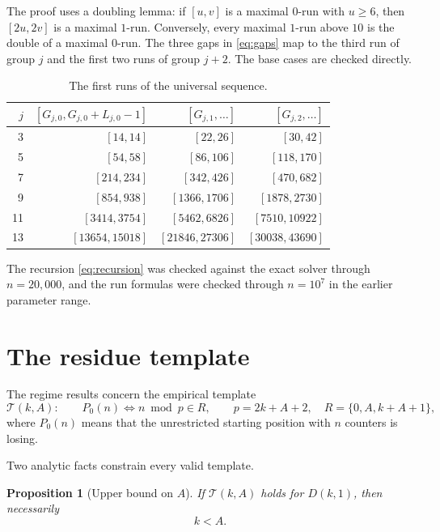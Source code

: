 \documentclass[11pt]{article}
\newtheorem{proposition}[theorem]{Proposition}
\theoremstyle{remark}
\begin{document}
The proof uses a doubling lemma: if \([u,v]\) is a maximal \(0\)-run with \(u\ge6\), then \([2u,2v]\) is a maximal \(1\)-run. Conversely, every maximal \(1\)-run above \(10\) is the double of a maximal \(0\)-run. The three gaps in \eqref{eq:gaps} map to the third run of group \(j\) and the first two runs of group \(j+2\). The base cases are checked directly.

\begin{table}[h]
\centering
\small
\caption{The first runs of the universal sequence.}
\label{tab:runs}
\begin{tabular}{rrrr}
\toprule
\(j\) & \([G_{j,0},G_{j,0}+L_{j,0}-1]\) & \([G_{j,1},\dots]\) & \([G_{j,2},\dots]\)\\
\midrule
3 & \([14,14]\) & \([22,26]\) & \([30,42]\)\\
5 & \([54,58]\) & \([86,106]\) & \([118,170]\)\\
7 & \([214,234]\) & \([342,426]\) & \([470,682]\)\\
9 & \([854,938]\) & \([1366,1706]\) & \([1878,2730]\)\\
11 & \([3414,3754]\) & \([5462,6826]\) & \([7510,10922]\)\\
13 & \([13654,15018]\) & \([21846,27306]\) & \([30038,43690]\)\\
\bottomrule
\end{tabular}
\end{table}

The recursion \eqref{eq:recursion} was checked against the exact solver through \(n=20{,}000\), and the run formulas were checked through \(n=10^7\) in the earlier parameter range.

\section{The residue template}\label{sec:template}

The regime results concern the empirical template
\begin{equation}\label{eq:template}
\boxed{
\mathcal T(k,A):\qquad
P_0(n)\iff n\bmod p\in R,
\qquad
p=2k+A+2,\quad
R=\{0,A,k+A+1\},
}
\end{equation}
where \(P_0(n)\) means that the unrestricted starting position with \(n\) counters is losing.

Two analytic facts constrain every valid template.

\begin{proposition}[Upper bound on \(A\)]\label{prop:upper}
If \(\mathcal T(k,A)\) holds for \(D(k,1)\), then necessarily
\begin{equation}\label{eq:kA}
k<A.
\end{equation}
\end{proposition}
\end{document}
